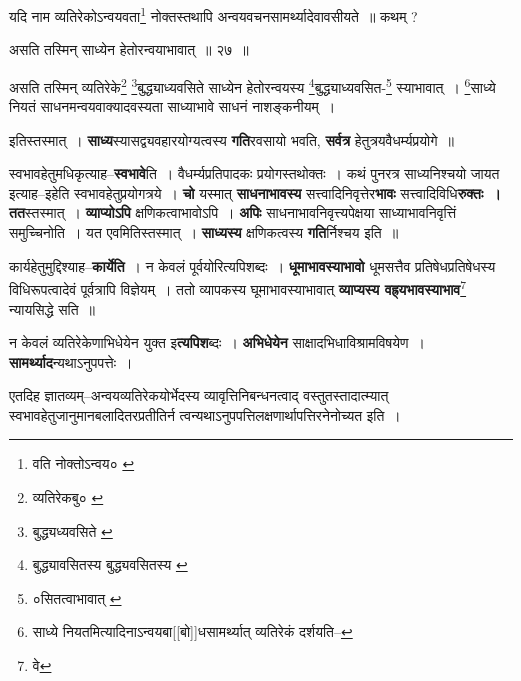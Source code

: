 \documentclass[article,12pt,a4paper]{memoir}
\begin{document}
	  \pstart यदि नाम व्यतिरेकोऽन्वयवता\footnote{वति नोक्तोऽन्वय० \cite{dp-msA} \cite{dp-edP} \cite{dp-edE} \cite{dp-msC}} नोक्तस्तथापि अन्वयवचनसामर्थ्यादेवावसीयते ॥ कथम् ?
	\pend
       
	  \bigskip
	  \begingroup
	

	  \pstart असति तस्मिन् साध्येन हेतोरन्वयाभावात् ॥ २७ ॥
	\pend
      
	  \endgroup
	 

	  \pstart असति तस्मिन् व्यतिरेके\footnote{व्यतिरेकबु० \cite{dp-msA}} \footnote{बुद्ध्यध्यवसिते \cite{dp-msA} \cite{dp-msB} \cite{dp-edP} \cite{dp-edH} \cite{dp-edE} \cite{dp-edN}}\-बुद्ध्याध्यवसिते साध्येन हेतोरन्वयस्य \footnote{बुद्ध्यावसितस्य \cite{dp-msA} \cite{dp-edP} \cite{dp-edH} \cite{dp-edE} \cite{dp-edN} बुद्ध्यवसितस्य \cite{dp-msB} \cite{dp-msD}}\-बुद्ध्याध्यवसित-\footnote{०सितत्वाभावात् \cite{dp-msC}} स्याभावात् । \footnote{साध्ये नियतमित्यादिनाऽन्वयबा[[बो]]धसामर्थ्यात् व्यतिरेकं दर्शयति--\cite{dp-msD-n}}\-साध्ये नियतं साधनमन्वयवाक्यादवस्यता साध्याभावे साधनं नाशङ्कनीयम् ।
	\pend
      
	  \endgroup
	

	  \pstart इतिस्तस्मात् । \textbf{साध्य}स्यासद्व्यवहारयोग्यत्वस्य \textbf{गति}रवसायो भवति, \textbf{सर्वत्र} हेतुत्रयवैधर्म्यप्रयोगे ॥
	\pend
      

	  \pstart स्वभावहेतुमधिकृत्याह--\textbf{स्वभावे}ति । वैधर्म्यप्रतिपादकः प्रयोगस्तथोक्तः । कथं पुनरत्र साध्यनिश्चयो जायत इत्याह--इहेति स्वभावहेतुप्रयोगत्रये । \textbf{चो} यस्मात् \textbf{साधनाभावस्य} सत्त्वादिनिवृत्तेर\textbf{भावः} सत्त्वादिविधि\textbf{रुक्तः । तत}स्तस्मात् । \textbf{व्याप्योऽपि} क्षणिकत्वाभावोऽपि । \textbf{अपिः} साधनाभावनिवृत्त्यपेक्षया साध्याभावनिवृत्तिं समुच्चिनोति । यत एवमितिस्तस्मात् । \textbf{साध्यस्य} क्षणिकत्वस्य \textbf{गति}र्निश्चय इति ॥
	\pend
      

	  \pstart कार्यहेतुमुद्दिश्याह--\textbf{कार्येति} । न केवलं पूर्वयोरित्यपिशब्दः । \textbf{धूमाभावस्याभावो} धूमसत्तैव प्रतिषेधप्रतिषेधस्य विधिरूपत्वादेवं पूर्वत्रापि विज्ञेयम् । ततो व्यापकस्य घूमाभावस्याभावात् \textbf{व्याप्यस्य वह्र्यभावस्याभाव}\footnote{वे} न्यायसिद्धे सति ॥
	\pend
      

	  \pstart न केवलं व्यतिरेकेणाभिधेयेन युक्त इ\textbf{त्यपिश}ब्दः । \textbf{अभिधेयेन} साक्षादभिधाविश्रामविषयेण । \textbf{सामर्थ्याद}न्यथाऽनुपपत्तेः ।
	\pend
      

	  \pstart एतदिह ज्ञातव्यम्--अन्वयव्यतिरेकयोर्भेदस्य व्यावृत्तिनिबन्धनत्वाद् वस्तुतस्तादात्म्यात् स्वभावहेतुजानुमानबलादितरप्रतीतिर्न त्वन्यथाऽनुपपत्तिलक्षणार्थापत्तिरनेनोच्यत इति ।
	\pend
	  \bigskip
	  \begingroup
	
\end{document}
